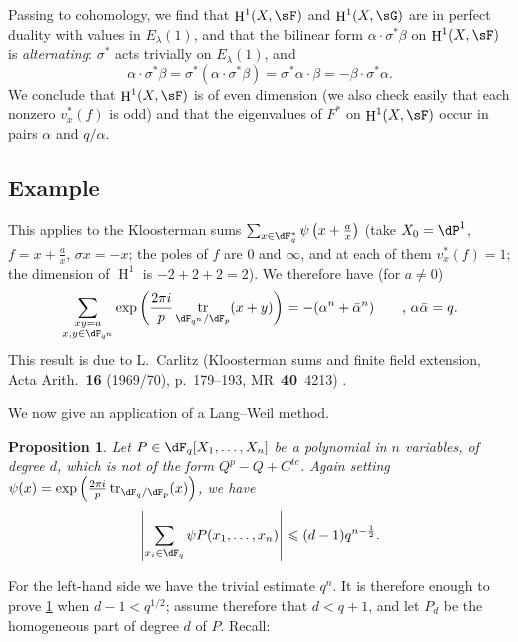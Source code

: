 \documentclass[oneside]{book}
\DeclareMathOperator{\h}{H}
\DeclareMathOperator{\tr}{tr}
\theoremstyle{sga-source}
\theoremstyle{sga-source-dash}
\theoremstyle{sga-source-dotdash}
\theoremstyle{sga-source-number-note-dash}
\theoremstyle{sga-source-note-number-dotdash}
\theoremstyle{sga-source-example-dotdash}
\theoremstyle{sga-source-inline-number}
\theoremstyle{sga-source-bare-number}
\theoremstyle{sga-source}
\newtheorem{proposition_}[subsection]{Proposition}
\newcommand{\PrintPage}[1]{}\newcommand{\MathPage}[1]{}\newcommand{\PrintCite}[2]{#1}\newcommand{\var}[3]{#1}
\begin{document}
Passing to cohomology, we find that $\h^1(X,\sF)$ and $\h^1(X,\sG)$ are in 
\var{perfect duality with values in $E_\lambda(1)$}{perfect duality with values in $E_\lambda(-1)$}{S45-SOL-0780}, and that the bilinear form 
$\alpha\cdot \sigma^\ast\beta$ on $\h^1(X,\sF)$ is \emph{alternating}: 
\var{$\sigma^\ast$ acts trivially on $E_\lambda(1)$}{$\sigma^\ast$ acts trivially on $E_\lambda(-1)$}{S45-SOL-0781}, and 
\[
  \alpha\cdot \sigma^\ast \beta = \sigma^\ast(\alpha\cdot \sigma^\ast \beta) = \sigma^\ast \alpha\cdot \beta = -\beta\cdot \sigma^\ast \alpha \text{.} 
\]
We conclude that $\h^1(X,\sF)$ is of even dimension (we also check 
    easily that each nonzero $v_x^\ast(f)$ is odd) and that the 
eigenvalues of $F^\ast$ on $\h^1(X,\sF)$ occur in pairs $\alpha$ and 
$q/\alpha$. 





\PrintPage{193}
\subsection{Example}\label{VI:3-7}

This applies to the Kloosterman sums 
$\sum_{x\in \dF_q^\ast} \psi\left(x+\frac a x\right)$ (take 
$X_0=\dP^1$, $f=x+\frac a x$, $\sigma x=-x$; the poles of $f$ are $0$ and 
$\infty$, and at each of them $v_x^\ast(f)=1$; the dimension of $\h^1$ is 
$-2+2+2=2$). We therefore have (for $a\ne 0$) 
\[
  \sum_{\substack{x y=a \\ x,y\in \dF_{q^n}}} \exp\left(\frac{2\pi i}{p} \tr_{\dF_{q^n}/\dF_p}(x+y)\right) = -(\alpha^n+\bar\alpha^n) \qquad \text{, }\alpha\bar \alpha = q \text{.} 
\]
This result is due to L.\ Carlitz (Kloosterman sums and finite field extension, Acta Arith.~\textbf{16} (1969/70), p.~179--193, MR~\textbf{40}~4213) \cite{ca69}. 

We now give an application of a Lang--Weil method. 





\begin{proposition_}\label{VI:3-8}
Let $P\in \dF_q[X_1,\dots,X_n]$ be a polynomial in $n$ variables, of degree 
$d$, which is not of the form $Q^p-Q+C^{te}$. Again setting 
$\psi(x) = \exp\left(\frac{2\pi i}{p} \tr_{\dF_q/\dF_p}(x)\right)$, we have 
\[
  \left|\sum_{x_i\in \dF_q} \psi P(x_1,\dots,x_n)\right| \leqslant (d-1) q^{n-\frac 1 2} \text{.}
\]
\end{proposition_}

For the left-hand side we have the trivial estimate $q^n$. It is therefore enough to 
prove \ref{VI:3-8} when $d-1<q^{1/2}$; assume therefore that 
$d<q+1$, and let $P_d$ be the homogeneous part of degree $d$ of $P$. Recall: 
\end{document}
